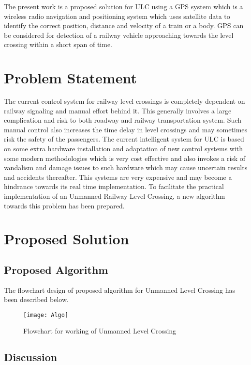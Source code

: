 \documentclass{llncs}
\begin{document}
The present work is a proposed solution for ULC using a GPS system which is a wireless radio navigation and positioning system which uses satellite data to identify the correct position, distance and velocity of a train or a body. GPS can be considered for detection of a railway vehicle approaching towards the level crossing within a short span of time.\\ 

\section{Problem Statement}

The current control system for railway level crossings is completely dependent on railway signaling and manual effort behind it. This generally involves a large complication and risk to both roadway and railway transportation system. Such manual control also increases the time delay in level crossings and may sometimes risk the safety of the passengers. The current intelligent system for ULC is based on some extra hardware installation and adaptation of new control systems with some modern methodologies which is very cost effective and also invokes a risk of vandalism and damage issues to such hardware which may cause uncertain results and accidents thereafter. This systems are very expensive and may become a hindrance towards its real time implementation. To facilitate the practical implementation of an Unmanned Railway Level Crossing, a new algorithm towards this problem has been prepared.\\

\section{Proposed Solution}
\label{sec:soln}
\subsection{Proposed Algorithm}

The flowchart design of proposed algorithm for Unmanned Level Crossing has been described below.

\begin{figure}[htbp]
	\centerline{\texttt{[image: Algo]}}
	\caption{Flowchart for working of Unmanned Level Crossing }
	\label{fig:algo}
\end{figure}

\subsection{Discussion}
\end{document}
